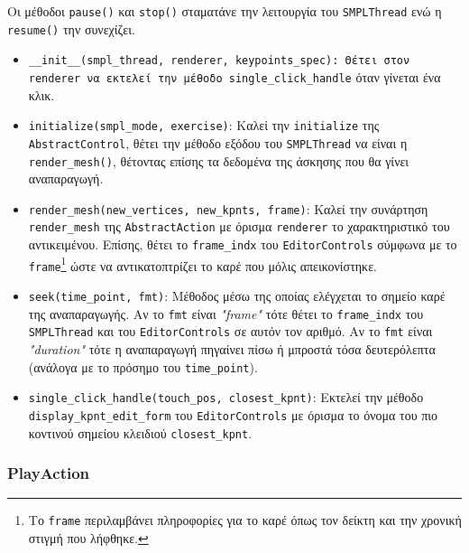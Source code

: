 Οι μέθοδοι \texttt{pause()} και \texttt{stop()} σταματάνε την λειτουργία του \texttt{SMPLThread} ενώ η \texttt{resume()} την συνεχίζει.
\begin{itemize}
	\item \texttt{\_\_init\_\_(smpl\_thread, renderer, keypoints\_spec): Θέτει στον \texttt{renderer} να εκτελεί την μέθοδο \texttt{single\_click\_handle}} όταν γίνεται ένα κλικ.
	\item \texttt{initialize(smpl\_mode, exercise)}: Καλεί την \texttt{initialize} της \texttt{AbstractControl}, θέτει την μέθοδο εξόδου του \texttt{SMPLThread} να είναι η \texttt{render\_mesh()}, θέτοντας επίσης τα δεδομένα της άσκησης που θα γίνει αναπαραγωγή.
	\item \texttt{render\_mesh(new\_vertices, new\_kpnts, frame)}: Καλεί την συνάρτηση \texttt{render\_mesh} της \texttt{AbstractAction} με όρισμα \texttt{renderer} το χαρακτηριστικό του αντικειμένου. Επίσης, θέτει το \texttt{frame\_indx} του \texttt{EditorControls} σύμφωνα με το \texttt{frame}\footnote{Το \texttt{frame} περιλαμβάνει πληροφορίες για το καρέ όπως τον δείκτη και την χρονική στιγμή που λήφθηκε.} ώστε να αντικατοπτρίζει το καρέ που μόλις απεικονίστηκε.
	\item \texttt{seek(time\_point, fmt)}: Μέθοδος μέσω της οποίας ελέγχεται το σημείο καρέ της αναπαραγωγής. Αν το \texttt{fmt} είναι \textsl{"frame"} τότε θέτει το \texttt{frame\_indx} του \texttt{SMPLThread} και του \texttt{EditorControls} σε αυτόν τον αριθμό. Αν το \texttt{fmt} είναι \textsl{"duration"} τότε η αναπαραγωγή πηγαίνει πίσω ή μπροστά τόσα δευτερόλεπτα (ανάλογα με το πρόσημο του \texttt{time\_point}).
	\item \texttt{single\_click\_handle(touch\_pos, closest\_kpnt)}: Εκτελεί την μέθοδο \texttt{display\_kpnt\_edit\_form} του \texttt{EditorControls} με όρισμα το όνομα του πιο κοντινού σημείου κλειδιού \texttt{closest\_kpnt}.
\end{itemize}


\subsubsection{PlayAction}

